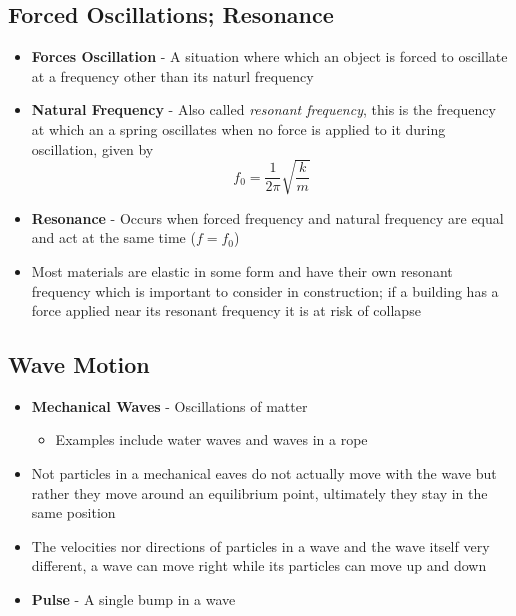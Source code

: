 \subsection{Forced Oscillations; Resonance}
\begin{itemize}
    \item \textbf{Forces Oscillation} - A situation where which an object is forced to oscillate at a frequency other than its naturl frequency
    \item \textbf{Natural Frequency} - Also called \emph{resonant frequency}, this is the frequency at which an a spring oscillates when no force is applied to it during oscillation, given by \[f_0=\frac{1}{2\pi}\sqrt{\frac{k}{m}}\]
    \item \textbf{Resonance} - Occurs when forced frequency and natural frequency are equal and act at the same time (\(f=f_0\)) 
    \item Most materials are elastic in some form and have their own resonant frequency which is important to consider in construction; if a building has a force applied near its resonant frequency it is at risk of collapse
\end{itemize}

\subsection{Wave Motion}
\begin{itemize}
    \item \textbf{Mechanical Waves} - Oscillations of matter 
    \begin{itemize}
        \item Examples include water waves and waves in a rope
    \end{itemize}
    \item Not particles in a mechanical eaves do not actually move with the wave but rather they move around an equilibrium point, ultimately they stay in the same position
    \item The velocities nor directions of particles in a wave and the wave itself very different, a wave can move right while its particles can move up and down
    \item \textbf{Pulse} - A single bump in a wave 
\end{itemize}

